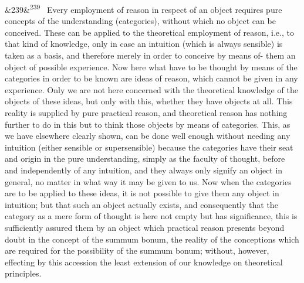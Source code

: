 \documentclass[12pt]{article}
\newcommand{\para}[1][]{\par\noindent\ifx&#1&\else\textsuperscript{\footnotesize #1}~\fi}
\begin{document}
\para[239] Every employment of reason in respect of an object requires pure concepts of the understanding (categories), without which no object can be conceived. These can be applied to the theoretical employment of reason, i.e., to that kind of knowledge, only in case an intuition (which is always sensible) is taken as a basis, and therefore merely in order to conceive by means of- them an object of possible experience. Now here what have to be thought by means of the categories in order to be known are ideas of reason, which cannot be given in any experience. Only we are not here concerned with the theoretical knowledge of the objects of these ideas, but only with this, whether they have objects at all. This reality is supplied by pure practical reason, and theoretical reason has nothing further to do in this but to think those objects by means of categories. This, as we have elsewhere clearly shown, can be done well enough without needing any intuition (either sensible or supersensible) because the categories have their seat and origin in the pure understanding, simply as the faculty of thought, before and independently of any intuition, and they always only signify an object in general, no matter in what way it may be given to us. Now when the categories are to be applied to these ideas, it is not possible to give them any object in intuition; but that such an object actually exists, and consequently that the category as a mere form of thought is here not empty but has significance, this is sufficiently assured them by an object which practical reason presents beyond doubt in the concept of the summum bonum, the reality of the conceptions which are required for the possibility of the summum bonum; without, however, effecting by this accession the least extension of our knowledge on theoretical principles.
\end{document}
